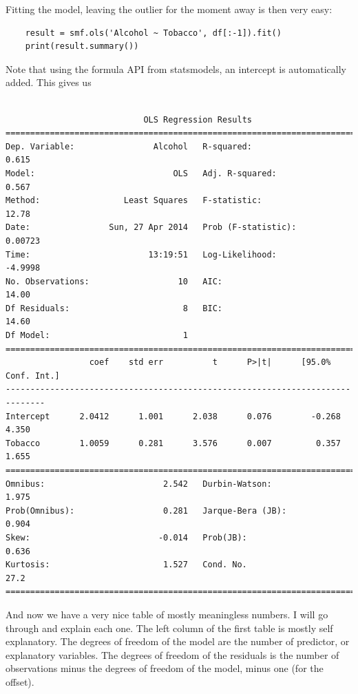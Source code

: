 Fitting the model, leaving the outlier for the moment away is then very easy:

\begin{lstlisting}
    result = smf.ols('Alcohol ~ Tobacco', df[:-1]).fit()
    print(result.summary())
\end{lstlisting}

Note that using the formula API from statsmodels, an intercept is automatically added.  This gives us
\small\begin{lstlisting}

                            OLS Regression Results
==============================================================================
Dep. Variable:                Alcohol   R-squared:                       0.615
Model:                            OLS   Adj. R-squared:                  0.567
Method:                 Least Squares   F-statistic:                     12.78
Date:                Sun, 27 Apr 2014   Prob (F-statistic):            0.00723
Time:                        13:19:51   Log-Likelihood:                -4.9998
No. Observations:                  10   AIC:                             14.00
Df Residuals:                       8   BIC:                             14.60
Df Model:                           1
==============================================================================
                 coef    std err          t      P>|t|      [95.0% Conf. Int.]
------------------------------------------------------------------------------
Intercept      2.0412      1.001      2.038      0.076        -0.268     4.350
Tobacco        1.0059      0.281      3.576      0.007         0.357     1.655
==============================================================================
Omnibus:                        2.542   Durbin-Watson:                   1.975
Prob(Omnibus):                  0.281   Jarque-Bera (JB):                0.904
Skew:                          -0.014   Prob(JB):                        0.636
Kurtosis:                       1.527   Cond. No.                         27.2
==============================================================================
\end{lstlisting}
\normalsize


And now we have a very nice table of mostly meaningless numbers. I will go through and explain each one. The left column of the first table is mostly self explanatory. The degrees of freedom of the model are the number of predictor, or explanatory variables. The degrees of freedom of the residuals is the number of observations minus the degrees of freedom of the model, minus one (for the offset).

